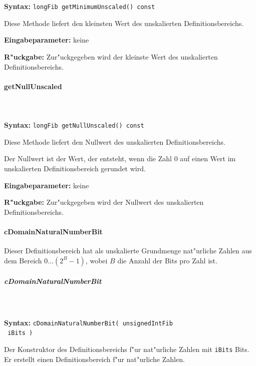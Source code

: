 \ \\\\\noindent
\textbf{Syntax:} \verb|longFib getMinimumUnscaled() const|

\bigskip\noindent
Diese Methode liefert den kleinsten Wert des unskalierten Definitionsbereichs.

\bigskip\noindent
\textbf{Eingabeparameter:} keine

\bigskip\noindent
\textbf{R"uckgabe:} Zur"uckgegeben wird der kleinste Wert des unskalierten Definitionsbereichs.


\paragraph{getNullUnscaled}

\ \\\\\noindent
\textbf{Syntax:} \verb|longFib getNullUnscaled() const|

\bigskip\noindent
Diese Methode liefert den Nullwert des unskalierten Definitionsbereichs.

Der Nullwert ist der Wert, der entsteht, wenn die Zahl $0$ auf einen Wert im unskalierten Definitionsbereich gerundet wird.

\bigskip\noindent
\textbf{Eingabeparameter:} keine

\bigskip\noindent
\textbf{R"uckgabe:} Zur"uckgegeben wird der Nullwert des unskalierten Definitionsbereichs.


\paragraph{cDomainNaturalNumberBit}

Dieser Definitionsbereich hat als unskalierte Grundmenge nat"urliche Zahlen aus dem Bereich $0 \ldots (2^B-1)$, wobei $B$ die Anzahl der Bits pro Zahl ist.


\subparagraph{cDomainNaturalNumberBit}

\ \\\\\noindent
\textbf{Syntax:} \verb|cDomainNaturalNumberBit( unsignedIntFib| \\\verb| iBits )|

\bigskip\noindent
Der Konstruktor des Definitionsbereichs f"ur nat"urliche Zahlen mit \verb|iBits| Bits. Er erstellt einen Definitionsbereich f"ur nat"urliche Zahlen.

